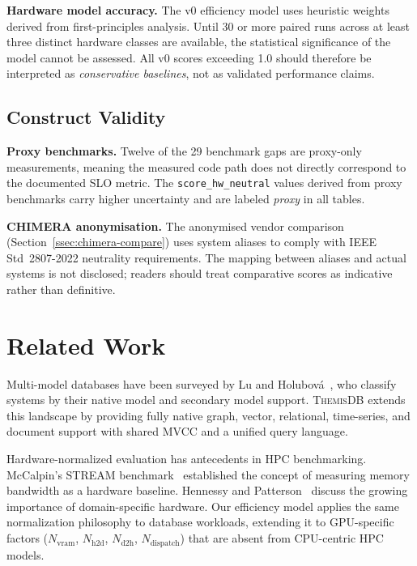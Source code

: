 \documentclass[conference]{IEEEtran}
\newcommand{\themis}{\textsc{ThemisDB}}
\begin{document}
\textbf{Hardware model accuracy.}
The v0 efficiency model uses heuristic weights derived from
first-principles analysis.
Until 30 or more paired runs across at least three distinct hardware
classes are available, the statistical significance of the model
cannot be assessed.
All v0 scores exceeding 1.0 should therefore be interpreted as
\emph{conservative baselines}, not as validated performance claims.

\subsection{Construct Validity}
\label{ssec:con-valid}

\textbf{Proxy benchmarks.}
Twelve of the 29 benchmark gaps are proxy-only measurements, meaning
the measured code path does not directly correspond to the
documented SLO metric.
The \texttt{score\_hw\_neutral} values derived from proxy benchmarks
carry higher uncertainty and are labeled \emph{proxy} in all tables.

\textbf{CHIMERA anonymisation.}
The anonymised vendor comparison (Section~\ref{ssec:chimera-compare})
uses system aliases to comply with IEEE Std~2807-2022 neutrality
requirements.
The mapping between aliases and actual systems is not disclosed;
readers should treat comparative scores as indicative rather than
definitive.

\section{Related Work}
\label{sec:related}

Multi-model databases have been surveyed by Lu and Holubov{\'a}~\cite{Lu2018},
who classify systems by their native model and secondary model support.
\themis{} extends this landscape by providing fully native graph,
vector, relational, time-series, and document support with shared
MVCC and a unified query language.

Hardware-normalized evaluation has antecedents in HPC benchmarking.
McCalpin's STREAM benchmark~\cite{McCalpin1995} established the
concept of measuring memory bandwidth as a hardware baseline.
Hennessy and Patterson~\cite{Hennessy2019} discuss the growing
importance of domain-specific hardware.
Our efficiency model applies the same normalization philosophy to
database workloads, extending it to GPU-specific factors
($N_{\text{vram}}$, $N_{\text{h2d}}$, $N_{\text{d2h}}$,
$N_{\text{dispatch}}$) that are absent from CPU-centric HPC models.
\end{document}
